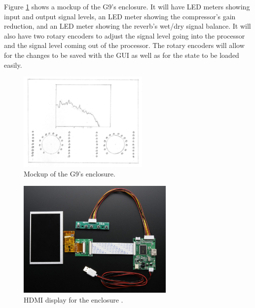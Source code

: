 \documentclass[journal]{IEEEtran}
\begin{document}
	Figure \ref{fig:g9Enclosure} shows a mockup of the G9's enclosure. It will have LED meters showing input and output signal levels, an LED meter showing the compressor's gain reduction, and an LED meter showing the reverb's wet/dry signal balance. It will also have two rotary encoders to adjust the signal level going into the processor and the signal level coming out of the processor. The rotary encoders will allow for the changes to be saved with the GUI as well as for the state to be loaded easily.
	\begin{figure}
		\centering
		\includegraphics[width=2.5in]{g9Enclosure}
		\caption{Mockup of the G9's enclosure. }
		\label{fig:g9Enclosure}
	\end{figure}
	
	
	\begin{figure}
		\centering
		\includegraphics[width=3in]{hdmiDisplay}
		\caption{HDMI display for the enclosure \cite{hdmiDisplay}. }
		\label{fig:hdmiDisplay}
	\end{figure}

	    
\end{document}
